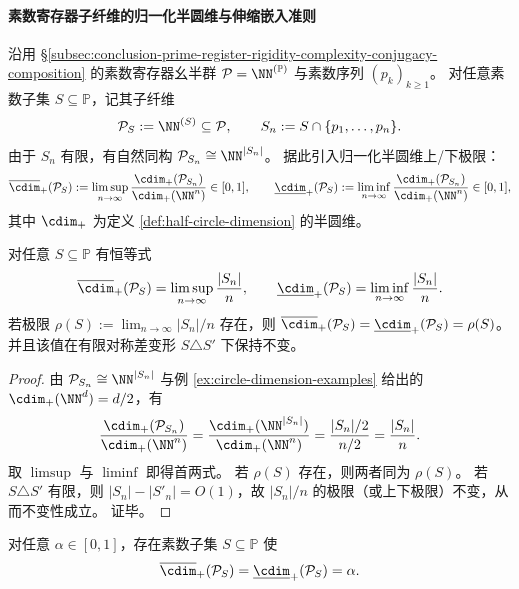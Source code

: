 \paragraph{素数寄存器子纤维的归一化半圆维与伸缩嵌入准则}\label{par:conclusion-prime-register-fiber-normalized-half-circle-dimension}
沿用 \S\ref{subsec:conclusion-prime-register-rigidity-complexity-conjugacy-composition} 的素数寄存器幺半群
\(
\mathcal P=\NN^{(\mathbb P)}
\)
与素数序列 \((p_k)_{k\ge 1}\)。
对任意素数子集 \(S\subseteq\mathbb P\)，记其子纤维
\[
\mathcal P_S:=\NN^{(S)}\subseteq \mathcal P,
\qquad
S_n:=S\cap\{p_1,\dots,p_n\}.
\]
由于 \(S_n\) 有限，有自然同构 \(\mathcal P_{S_n}\cong \NN^{|S_n|}\)。
据此引入归一化半圆维上/下极限：
\[
\overline{\cdim}_+(\mathcal P_S)
:=\limsup_{n\to\infty}\frac{\cdim_+(\mathcal P_{S_n})}{\cdim_+(\NN^n)}\in[0,1],
\qquad
\underline{\cdim}_+(\mathcal P_S)
:=\liminf_{n\to\infty}\frac{\cdim_+(\mathcal P_{S_n})}{\cdim_+(\NN^n)}\in[0,1],
\]
其中 \(\cdim_+\) 为定义 \ref{def:half-circle-dimension} 的半圆维。

\begin{theorem}[归一化半圆维等同于素数索引密度]\label{thm:conclusion-prime-register-fiber-cdim-density}
对任意 \(S\subseteq\mathbb P\) 有恒等式
\[
\overline{\cdim}_+(\mathcal P_S)=\limsup_{n\to\infty}\frac{|S_n|}{n},
\qquad
\underline{\cdim}_+(\mathcal P_S)=\liminf_{n\to\infty}\frac{|S_n|}{n}.
\]
若极限
\(
\rho(S):=\lim_{n\to\infty}|S_n|/n
\)
存在，则
\(
\overline{\cdim}_+(\mathcal P_S)=\underline{\cdim}_+(\mathcal P_S)=\rho(S)
\)。
并且该值在有限对称差变形 \(S\triangle S'\) 下保持不变。
\end{theorem}

\begin{proof}
由 \(\mathcal P_{S_n}\cong \NN^{|S_n|}\) 与例 \ref{ex:circle-dimension-examples} 给出的 \(\cdim_+(\NN^d)=d/2\)，有
\[
\frac{\cdim_+(\mathcal P_{S_n})}{\cdim_+(\NN^n)}
=\frac{\cdim_+(\NN^{|S_n|})}{\cdim_+(\NN^n)}
=\frac{|S_n|/2}{n/2}
=\frac{|S_n|}{n}.
\]
取 \(\limsup\) 与 \(\liminf\) 即得首两式。
若 \(\rho(S)\) 存在，则两者同为 \(\rho(S)\)。
若 \(S\triangle S'\) 有限，则 \(|S_n|-|S'_n|=O(1)\)，故 \(|S_n|/n\) 的极限（或上下极限）不变，从而不变性成立。
证毕。
\end{proof}

\begin{proposition}[任意分数半圆维的可实现性]\label{prop:conclusion-prime-register-fiber-cdim-realize-any-alpha}
对任意 \(\alpha\in[0,1]\)，存在素数子集 \(S\subseteq\mathbb P\) 使
\[
\overline{\cdim}_+(\mathcal P_S)=\underline{\cdim}_+(\mathcal P_S)=\alpha.
\]
\end{proposition}

